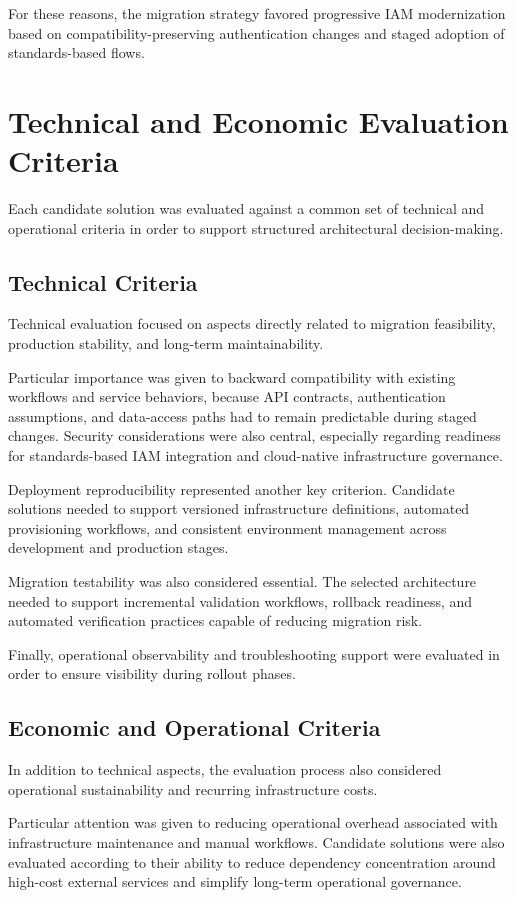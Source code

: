 For these reasons, the migration strategy favored progressive IAM modernization based on compatibility-preserving authentication changes and staged adoption of standards-based flows.

\section{Technical and Economic Evaluation Criteria}
Each candidate solution was evaluated against a common set of technical and operational criteria in order to support structured architectural decision-making.

\subsection{Technical Criteria}
Technical evaluation focused on aspects directly related to migration feasibility, production stability, and long-term maintainability.

Particular importance was given to backward compatibility with existing workflows and service behaviors, because API contracts, authentication assumptions, and data-access paths had to remain predictable during staged changes. Security considerations were also central, especially regarding readiness for standards-based IAM integration and cloud-native infrastructure governance.

Deployment reproducibility represented another key criterion. Candidate solutions needed to support versioned infrastructure definitions, automated provisioning workflows, and consistent environment management across development and production stages.

Migration testability was also considered essential. The selected architecture needed to support incremental validation workflows, rollback readiness, and automated verification practices capable of reducing migration risk.

Finally, operational observability and troubleshooting support were evaluated in order to ensure visibility during rollout phases.

\subsection{Economic and Operational Criteria}
In addition to technical aspects, the evaluation process also considered operational sustainability and recurring infrastructure costs.

Particular attention was given to reducing operational overhead associated with infrastructure maintenance and manual workflows. Candidate solutions were also evaluated according to their ability to reduce dependency concentration around high-cost external services and simplify long-term operational governance.

